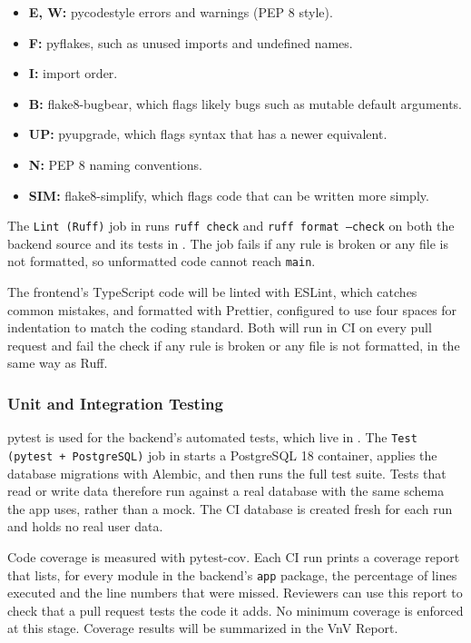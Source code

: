 \documentclass[12pt, titlepage]{article}
\begin{document}
\begin{itemize}
  \item \textbf{E, W:} pycodestyle errors and warnings (PEP 8 style).
  \item \textbf{F:} pyflakes, such as unused imports and undefined names.
  \item \textbf{I:} import order.
  \item \textbf{B:} flake8-bugbear, which flags likely bugs such as mutable
    default arguments.
  \item \textbf{UP:} pyupgrade, which flags syntax that has a newer
    equivalent.
  \item \textbf{N:} PEP 8 naming conventions.
  \item \textbf{SIM:} flake8-simplify, which flags code that can be written
    more simply.
\end{itemize}

The \texttt{Lint (Ruff)} job in  runs
\texttt{ruff check} and \texttt{ruff format --check} on both the backend source
and its tests in . The job fails if any rule is broken or
any file is not formatted, so unformatted code cannot reach \texttt{main}.

The frontend's TypeScript code will be linted with ESLint, which catches
common mistakes, and formatted with Prettier, configured to use four spaces
for indentation to match the coding standard. Both will run in CI on every
pull request and fail the check if any rule is broken or any file is not
formatted, in the same way as Ruff.

\subsubsection{Unit and Integration Testing}

pytest is used for the backend's automated tests, which live in
. The \texttt{Test (pytest + PostgreSQL)} job in
 starts a PostgreSQL 18 container,
applies the database migrations with Alembic, and then runs the full test
suite. Tests that read or write data therefore run against a real database
with the same schema the app uses, rather than a mock. The CI database is
created fresh for each run and holds no real user data.

Code coverage is measured with pytest-cov. Each CI run prints a coverage
report that lists, for every module in the backend's \texttt{app} package, the
percentage of lines executed and the line numbers that were missed. Reviewers
can use this report to check that a pull request tests the code it adds. No
minimum coverage is enforced at this stage. Coverage results will be
summarized in the VnV Report.
\end{document}
